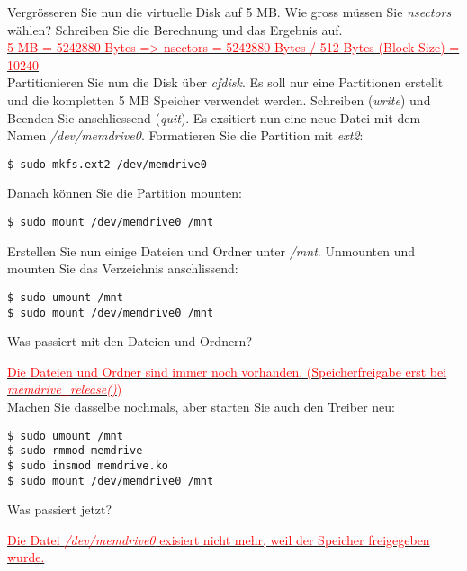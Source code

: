 Vergrösseren Sie nun die virtuelle Disk auf 5 MB. Wie gross müssen Sie \emph{nsectors} wählen?
Schreiben Sie die Berechnung und das Ergebnis auf. \\


\underline{\textcolor{red}{5 MB = 5242880 Bytes => nsectors = 5242880 Bytes / 512 Bytes (Block Size) = 10240}\hspace{0.1\textwidth}} \\

Partitionieren Sie nun die Disk über \emph{cfdisk}. Es soll nur eine Partitionen erstellt und die kompletten
5 MB Speicher verwendet werden. Schreiben (\emph{write}) und Beenden Sie anschliessend (\emph{quit}). Es exsitiert nun eine
neue Datei mit dem Namen \emph{/dev/memdrive0}. Formatieren Sie die Partition mit \emph{ext2}:
\begin{lstlisting}
$ sudo mkfs.ext2 /dev/memdrive0
\end{lstlisting}

Danach können Sie die Partition mounten:
\begin{lstlisting}
$ sudo mount /dev/memdrive0 /mnt
\end{lstlisting}

Erstellen Sie nun einige Dateien und Ordner unter \emph{/mnt}. Unmounten und mounten Sie das Verzeichnis anschlissend:
\begin{lstlisting}
$ sudo umount /mnt
$ sudo mount /dev/memdrive0 /mnt
\end{lstlisting}

Was passiert mit den Dateien und Ordnern?

\underline{\textcolor{red}{Die Dateien und Ordner sind immer noch vorhanden. (Speicherfreigabe erst bei \emph{memdrive\_release()})}} \\

Machen Sie dasselbe nochmals, aber starten Sie auch den Treiber neu:
\begin{lstlisting}
$ sudo umount /mnt
$ sudo rmmod memdrive
$ sudo insmod memdrive.ko
$ sudo mount /dev/memdrive0 /mnt
\end{lstlisting}

Was passiert jetzt?

\underline{\textcolor{red}{Die Datei \emph{/dev/memdrive0} exisiert nicht mehr, weil der Speicher freigegeben wurde.}\hspace{0.2\textwidth}} \\
